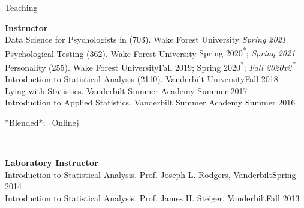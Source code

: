 \begin{rSection}{\textrm{Teaching}}
\vspace*{2pt}
\begin{minipage}{\linewidth}{\large {\bf Instructor}\\}
Data Science for Psychologists in \R (703). Wake Forest University \hfill {\textit{Spring 2021}}\smallskip\\
Psychological Testing  (362). Wake Forest University \hfill {Spring 2020\textsuperscript{*}; \textit{Spring 2021}}\smallskip\\%
Personality (255). Wake Forest University\hfill{Fall 2019; Spring 2020\textsuperscript{*}; \textit{Fall 2020x2\textsuperscript{*}\notbns}}\smallskip\\
Introduction to Statistical Analysis (2110). Vanderbilt University\hfill {Fall 2018}\smallskip\\
Lying with Statistics. Vanderbilt Summer Academy \hfill{Summer 2017}\smallskip\\
Introduction to Applied Statistics. Vanderbilt Summer Academy \hfill{Summer 2016}%
\end{minipage}
\vspace{-1mm}\begin{center}\footnotesize{*Blended*; $\dagger$Online$\dagger$}\end{center} \vspace{-3mm}
\smallskip\\
\begin{minipage}{\linewidth}{\large {\bf Laboratory Instructor}\\}
Introduction to Statistical Analysis. Prof. Joseph L. Rodgers, Vanderbilt\hfill  {Spring 2014}%
\smallskip\\
Introduction to Statistical Analysis. Prof. James H. Steiger, Vanderbilt\hfill  {Fall 2013}%

\end{minipage}
\end{rSection}
